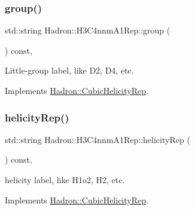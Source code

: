 \mbox{\label{structHadron_1_1H3C4nnmA1Rep_a90bcfd4f15d29f444a79b1dcd8198ea5}} 
\subsubsection{\texorpdfstring{group()}{group()}\hspace{0.1cm}{\footnotesize\ttfamily [5/5]}}
{\footnotesize\ttfamily std\+::string Hadron\+::\+H3\+C4nnm\+A1\+Rep\+::group (\begin{DoxyParamCaption}{ }\end{DoxyParamCaption}) const\hspace{0.3cm}{\ttfamily [inline]}, {\ttfamily [virtual]}}

Little-\/group label, like D2, D4, etc. 

Implements \mbox{\hyperlink{structHadron_1_1CubicHelicityRep_a101a7d76cd8ccdad0f272db44b766113}{Hadron\+::\+Cubic\+Helicity\+Rep}}.

\mbox{\label{structHadron_1_1H3C4nnmA1Rep_a0bd69f3a04496d18380f553e0fea11b0}} 
\subsubsection{\texorpdfstring{helicityRep()}{helicityRep()}\hspace{0.1cm}{\footnotesize\ttfamily [1/3]}}
{\footnotesize\ttfamily std\+::string Hadron\+::\+H3\+C4nnm\+A1\+Rep\+::helicity\+Rep (\begin{DoxyParamCaption}{ }\end{DoxyParamCaption}) const\hspace{0.3cm}{\ttfamily [inline]}, {\ttfamily [virtual]}}

helicity label, like H1o2, H2, etc. 

Implements \mbox{\hyperlink{structHadron_1_1CubicHelicityRep_af1096946b7470edf0a55451cc662f231}{Hadron\+::\+Cubic\+Helicity\+Rep}}.

\mbox{\label{structHadron_1_1H3C4nnmA1Rep_a0bd69f3a04496d18380f553e0fea11b0}} 
